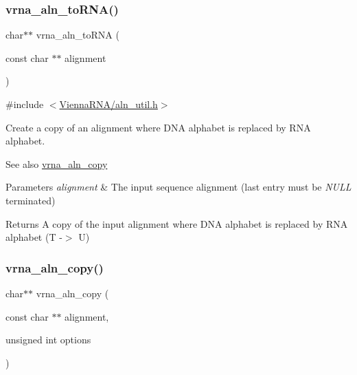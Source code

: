 \subsubsection{\texorpdfstring{vrna\+\_\+aln\+\_\+to\+R\+N\+A()}{vrna\_aln\_toRNA()}}
{\footnotesize\ttfamily char$\ast$$\ast$ vrna\+\_\+aln\+\_\+to\+R\+NA (\begin{DoxyParamCaption}\item[{const char $\ast$$\ast$}]{alignment }\end{DoxyParamCaption})}



{\ttfamily \#include $<$\hyperlink{aln__util_8h}{Vienna\+R\+N\+A/aln\+\_\+util.\+h}$>$}



Create a copy of an alignment where D\+NA alphabet is replaced by R\+NA alphabet. 

\begin{DoxySeeAlso}{See also}
\hyperlink{group__aln__utils_ga08cdca592461436860daf9738279ce17}{vrna\+\_\+aln\+\_\+copy}
\end{DoxySeeAlso}

\begin{DoxyParams}{Parameters}
{\em alignment} & The input sequence alignment (last entry must be {\itshape N\+U\+LL} terminated) \\
\hline
\end{DoxyParams}
\begin{DoxyReturn}{Returns}
A copy of the input alignment where D\+NA alphabet is replaced by R\+NA alphabet (T -\/$>$ U) 
\end{DoxyReturn}
\mbox{\label{group__aln__utils_ga08cdca592461436860daf9738279ce17}} 
\subsubsection{\texorpdfstring{vrna\+\_\+aln\+\_\+copy()}{vrna\_aln\_copy()}}
{\footnotesize\ttfamily char$\ast$$\ast$ vrna\+\_\+aln\+\_\+copy (\begin{DoxyParamCaption}\item[{const char $\ast$$\ast$}]{alignment,  }\item[{unsigned int}]{options }\end{DoxyParamCaption})}




